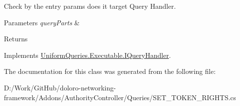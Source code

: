 Check by the entry params does it target Query Handler. 


\begin{DoxyParams}{Parameters}
{\em query\+Parts} & \\
\hline
\end{DoxyParams}
\begin{DoxyReturn}{Returns}

\end{DoxyReturn}


Implements \mbox{\hyperlink{interface_uniform_queries_1_1_executable_1_1_i_query_handler_a0f43184bf3e306a7cbebc39098f044ee}{Uniform\+Queries.\+Executable.\+I\+Query\+Handler}}.



The documentation for this class was generated from the following file\+:\begin{DoxyCompactItemize}
\item 
D\+:/\+Work/\+Git\+Hub/doloro-\/networking-\/framework/\+Addons/\+Authority\+Controller/\+Queries/S\+E\+T\+\_\+\+T\+O\+K\+E\+N\+\_\+\+R\+I\+G\+H\+T\+S.\+cs\end{DoxyCompactItemize}
